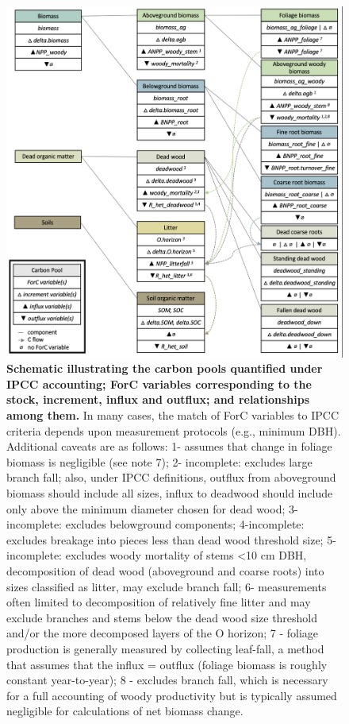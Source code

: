 \documentclass[, manuscript]{copernicus}
\begin{document}
\clearpage
\begin{figure}
\includegraphics[width=15cm]{figures_tables/C_variable_mapping} \caption{\textbf{Schematic illustrating the carbon pools quantified under IPCC accounting; ForC variables corresponding to the stock, increment, influx and outflux; and relationships among them.} In many cases, the match of ForC variables to IPCC criteria depends upon measurement protocols (e.g., minimum DBH). Additional caveats are as follows: 1- assumes that change in foliage biomass is negligible (see note 7); 2- incomplete: excludes large branch fall; also, under IPCC definitions, outflux from aboveground biomass should include all sizes, influx to deadwood should include only above the minimum diameter chosen for dead wood; 3- incomplete: excludes belowground components;  4-incomplete: excludes breakage into pieces less than dead wood threshold size; 5-incomplete: excludes woody mortality of stems <10 cm DBH, decomposition of dead wood (aboveground and coarse roots) into sizes classified as litter, may exclude branch fall; 6- measurements often limited to decomposition of relatively fine litter and may exclude branches and stems below the dead wood size threshold and/or the more decomposed layers of the O horizon; 7 - foliage production is generally measured by collecting leaf-fall, a method that assumes that the influx = outflux (foliage biomass is roughly constant year-to-year); 8 - excludes branch fall, which is necessary for a full accounting of woody productivity but is typically assumed negligible for calculations of net biomass change.}\label{fig:unnamed-chunk-1}
\end{figure}
\end{document}
